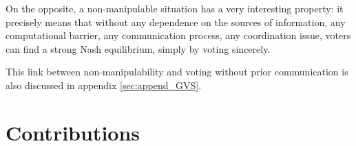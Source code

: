 
\medskip

On the opposite, a non-manipulable situation has a very interesting property: it precisely means that without any dependence on the sources of information, any computational barrier, any communication process, any coordination issue, voters can find a strong Nash equilibrium, simply by voting sincerely.

This link between non-manipulability and voting without prior communication is also discussed in appendix \ref{sec:append_GVS}.

\section{Contributions}




